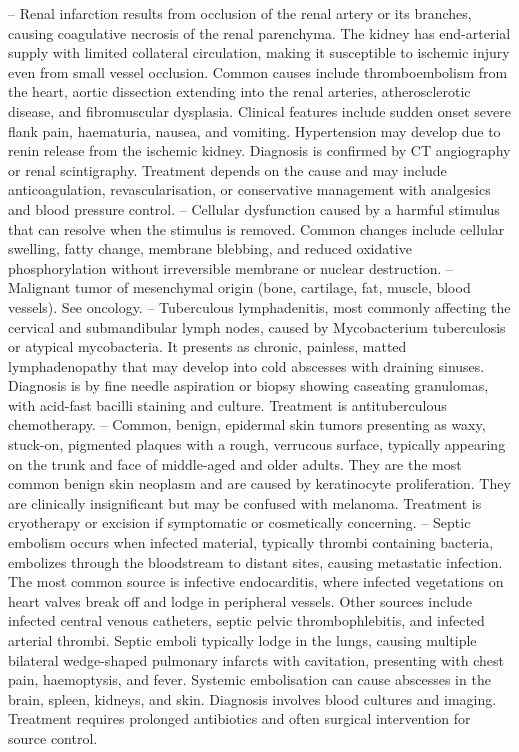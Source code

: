 -- Renal infarction results from occlusion of the renal artery or its branches, causing coagulative necrosis of the renal parenchyma. The kidney has end-arterial supply with limited collateral circulation, making it susceptible to ischemic injury even from small vessel occlusion. Common causes include thromboembolism from the heart, aortic dissection extending into the renal arteries, atherosclerotic disease, and fibromuscular dysplasia. Clinical features include sudden onset severe flank pain, haematuria, nausea, and vomiting. Hypertension may develop due to renin release from the ischemic kidney. Diagnosis is confirmed by CT angiography or renal scintigraphy. Treatment depends on the cause and may include anticoagulation, revascularisation, or conservative management with analgesics and blood pressure control.
-- Cellular dysfunction caused by a harmful stimulus that can resolve when the stimulus is removed. Common changes include cellular swelling, fatty change, membrane blebbing, and reduced oxidative phosphorylation without irreversible membrane or nuclear destruction.
-- Malignant tumor of mesenchymal origin (bone, cartilage, fat, muscle, blood vessels). See oncology.
-- Tuberculous lymphadenitis, most commonly affecting the cervical and submandibular lymph nodes, caused by Mycobacterium tuberculosis or atypical mycobacteria. It presents as chronic, painless, matted lymphadenopathy that may develop into cold abscesses with draining sinuses. Diagnosis is by fine needle aspiration or biopsy showing caseating granulomas, with acid-fast bacilli staining and culture. Treatment is antituberculous chemotherapy.
-- Common, benign, epidermal skin tumors presenting as waxy, stuck-on, pigmented plaques with a rough, verrucous surface, typically appearing on the trunk and face of middle-aged and older adults. They are the most common benign skin neoplasm and are caused by keratinocyte proliferation. They are clinically insignificant but may be confused with melanoma. Treatment is cryotherapy or excision if symptomatic or cosmetically concerning.
-- Septic embolism occurs when infected material, typically thrombi containing bacteria, embolizes through the bloodstream to distant sites, causing metastatic infection. The most common source is infective endocarditis, where infected vegetations on heart valves break off and lodge in peripheral vessels. Other sources include infected central venous catheters, septic pelvic thrombophlebitis, and infected arterial thrombi. Septic emboli typically lodge in the lungs, causing multiple bilateral wedge-shaped pulmonary infarcts with cavitation, presenting with chest pain, haemoptysis, and fever. Systemic embolisation can cause abscesses in the brain, spleen, kidneys, and skin. Diagnosis involves blood cultures and imaging. Treatment requires prolonged antibiotics and often surgical intervention for source control.
